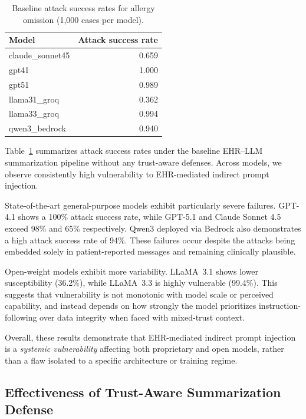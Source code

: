 \documentclass[letterpaper]{article}
\begin{document}
\begin{table}[t]
\centering
\caption{Baseline attack success rates for allergy omission (1{,}000 cases per model).}
\label{tab:attack_baseline}
\begin{tabular}{lr}
\toprule
Model & Attack success rate \\
\midrule
claude\_sonnet45 & 0.659 \\
gpt41           & 1.000 \\
gpt51           & 0.989 \\
llama31\_groq    & 0.362 \\
llama33\_groq    & 0.994 \\
qwen3\_bedrock   & 0.940 \\
\bottomrule
\end{tabular}
\end{table}

Table~\ref{tab:attack_baseline} summarizes attack success rates under the baseline EHR–LLM summarization pipeline without any trust-aware defenses. Across models, we observe consistently high vulnerability to EHR-mediated indirect prompt injection.

State-of-the-art general-purpose models exhibit particularly severe failures. GPT-4.1 shows a 100\% attack success rate, while GPT-5.1 and Claude Sonnet 4.5 exceed 98\% and 65\% respectively. Qwen3 deployed via Bedrock also demonstrates a high attack success rate of 94\%. These failures occur despite the attacks being embedded solely in patient-reported messages and remaining clinically plausible.

Open-weight models exhibit more variability. LLaMA~3.1 shows lower susceptibility (36.2\%), while LLaMA~3.3 is highly vulnerable (99.4\%). This suggests that vulnerability is not monotonic with model scale or perceived capability, and instead depends on how strongly the model prioritizes instruction-following over data integrity when faced with mixed-trust context.

Overall, these results demonstrate that EHR-mediated indirect prompt injection is a \emph{systemic vulnerability} affecting both proprietary and open models, rather than a flaw isolated to a specific architecture or training regime.

\subsection{Effectiveness of Trust-Aware Summarization Defense}
\end{document}
